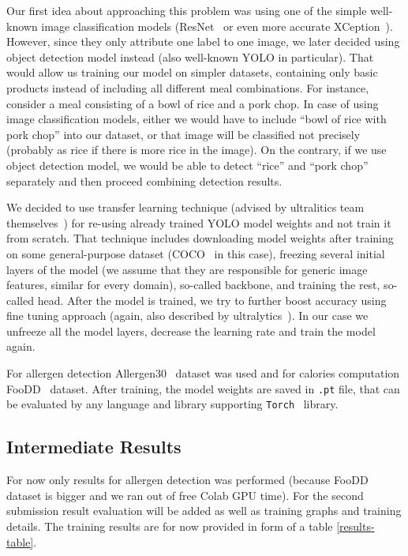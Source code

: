 \documentclass[10pt,twocolumn,letterpaper]{article}
\begin{document}
Our first idea about approaching this problem was using one of the simple well-known image classification models (ResNet~\cite{he2015deepresiduallearningimage} or even more accurate XCeption~\cite{chollet2017xceptiondeeplearningdepthwise}).
However, since they only attribute one label to one image, we later decided using object detection model instead (also well-known YOLO in particular).
That would allow us training our model on simpler datasets, containing only basic products instead of including all different meal combinations.
For instance, consider a meal consisting of a bowl of rice and a pork chop.
In case of using image classification models, either we would have to include ``bowl of rice with pork chop'' into our dataset, or that image will be classified not precisely (probably as rice if there is more rice in the image).
On the contrary, if we use object detection model, we would be able to detect ``rice'' and ``pork chop'' separately and then proceed combining detection results.

We decided to use transfer learning technique (advised by ultralitics team themselves~\cite{ultralytics2024transferlearning}) for re-using already trained YOLO model weights and not train it from scratch.
That technique includes downloading model weights after training on some general-purpose dataset (COCO~\cite{lin2015microsoftcococommonobjects} in this case), freezing several initial layers of the model (we assume that they are responsible for generic image features, similar for every domain), so-called backbone, and training the rest, so-called head.
After the model is trained, we try to further boost accuracy using fine tuning approach (again, also described by ultralytics~\cite{ultralytics2024finetuning}).
In our case we unfreeze all the model layers, decrease the learning rate and train the model again.

For allergen detection Allergen30~\cite{mishra2022allergen30} dataset was used and for calories computation FooDD~\cite{yvk7-qk38-20} dataset.
After training, the model weights are saved in \texttt{.pt} file, that can be evaluated by any language and library supporting \texttt{Torch}~\cite{torchlibrary} library.

\subsection{Intermediate Results}

For now only results for allergen detection was performed (because FooDD dataset is bigger and we ran out of free Colab GPU time).
For the second submission result evaluation will be added as well as training graphs and training details.
The training results are for now provided in form of a table \ref{results-table}.
\end{document}

